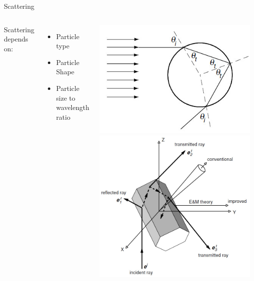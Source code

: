 \documentclass[compress,red,12pt]{beamer}
\begin{document}
\begin{frame}[T]{Scattering}
  \begin{columns}[T]
    Scattering depends on:\\
    \begin{itemize}
    \item Particle type
    \item Particle Shape
    \item Particle size to wavelength ratio
    \end{itemize}
    \centering
    \includegraphics[height=0.30\textheight]{images/scattering_spheric.jpg}
    \includegraphics[height=0.30\textheight]{images/scattering_nonspheric.jpg}
  \end{columns}
\end{frame}
\end{document}
